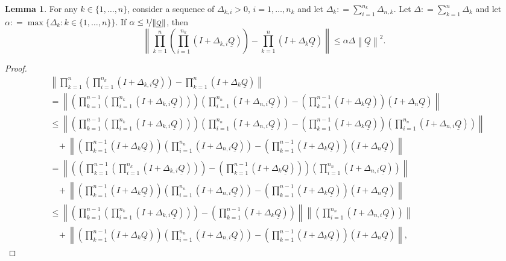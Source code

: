 \documentclass[10pt]{paper}
\theoremstyle{definition}
\newtheorem{lemma}[theorem]{Lemma}
\newcommand{\lrate}{\underline{Q}}
\newcommand{\norm}[1]{\left\lVert #1 \right\rVert}
\newcommand{\coloneqq}{:\!=}
\begin{document}
\begin{lemma}\label{lemma:differencebetweennested}
For any $k\in\{1,\dots,n\}$, consider a sequence of $\Delta_{k,i}>0$, $i=1,\dots,n_k$ and let $\Delta_k\coloneqq\sum_{i=1}^{n_k}\Delta_{n,k}$. Let $\Delta\coloneqq\sum_{k=1}^n\Delta_k$ and let $\alpha\coloneqq\max\{\Delta_k\colon k\in\{1,\dots,n\}\}$. If $\alpha\leq\nicefrac{1}{\norm{\lrate}}$, then
\begin{equation*}
\norm{\prod_{k=1}^n\left(\prod_{i=1}^{n_k}(I+\Delta_{k,i}\lrate)\right)
-
\prod_{k=1}^n(I+\Delta_k\lrate)
}
\leq\alpha\Delta\norm{\lrate}^2.
\end{equation*}
\end{lemma}
\begin{proof}
\begin{align*}
&\norm{\prod_{k=1}^n\left(\prod_{i=1}^{n_k}(I+\Delta_{k,i}\lrate)\right)
-
\prod_{k=1}^n(I+\Delta_k\lrate)
}\\
&=\norm{\left(\prod_{k=1}^{n-1}\left(\prod_{i=1}^{n_k}(I+\Delta_{k,i}\lrate)\right)\right)\left(\prod_{i=1}^{n_n}(I+\Delta_{n,i}\lrate)\right)
-
\left(\prod_{k=1}^{n-1}(I+\Delta_k\lrate)\right)(I+\Delta_n\lrate)
}\\
&\leq\norm{
\left(\prod_{k=1}^{n-1}\left(\prod_{i=1}^{n_k}(I+\Delta_{k,i}\lrate)\right)\right)\left(\prod_{i=1}^{n_n}(I+\Delta_{n,i}\lrate)\right)
-
\left(\prod_{k=1}^{n-1}(I+\Delta_k\lrate)\right)
\left(\prod_{i=1}^{n_n}(I+\Delta_{n,i}\lrate)\right)
}\\
&~~~~+\norm{
\left(\prod_{k=1}^{n-1}(I+\Delta_k\lrate)\right)
\left(\prod_{i=1}^{n_n}(I+\Delta_{n,i}\lrate)\right)
-
\left(\prod_{k=1}^{n-1}(I+\Delta_k\lrate)\right)(I+\Delta_n\lrate)
}\\
&=\norm{
\left(
\left(
\prod_{k=1}^{n-1}\left(\prod_{i=1}^{n_k}(I+\Delta_{k,i}\lrate)\right)
\right)
-
\left(\prod_{k=1}^{n-1}(I+\Delta_k\lrate)\right)
\right)
\left(\prod_{i=1}^{n_n}(I+\Delta_{n,i}\lrate)\right)
}\\
&~~~~+\norm{
\left(\prod_{k=1}^{n-1}(I+\Delta_k\lrate)\right)
\left(\prod_{i=1}^{n_n}(I+\Delta_{n,i}\lrate)\right)
-
\left(\prod_{k=1}^{n-1}(I+\Delta_k\lrate)\right)(I+\Delta_n\lrate)
}\\
&\leq\norm{
\left(
\prod_{k=1}^{n-1}\left(\prod_{i=1}^{n_k}(I+\Delta_{k,i}\lrate)\right)
\right)
-
\left(\prod_{k=1}^{n-1}(I+\Delta_k\lrate)\right)
}
\norm{
\left(\prod_{i=1}^{n_n}(I+\Delta_{n,i}\lrate)\right)
}\\
&~~~~+\norm{
\left(\prod_{k=1}^{n-1}(I+\Delta_k\lrate)\right)
\left(\prod_{i=1}^{n_n}(I+\Delta_{n,i}\lrate)\right)
-
\left(\prod_{k=1}^{n-1}(I+\Delta_k\lrate)\right)(I+\Delta_n\lrate)
},
\end{align*}


\end{proof}
\end{document}
